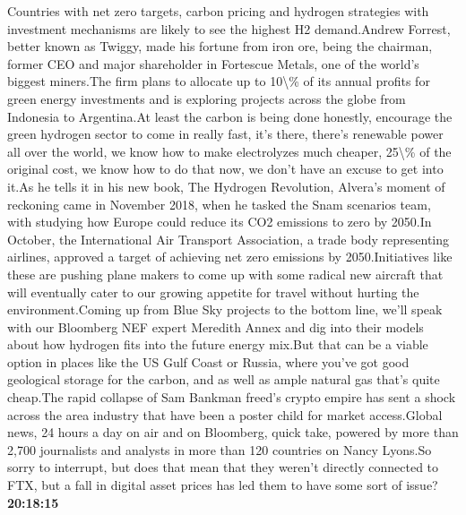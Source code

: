 \documentclass{article}%
\begin{document}
Countries with net zero targets, carbon pricing and hydrogen strategies with investment mechanisms are likely to see the highest H2 demand.Andrew Forrest, better known as Twiggy, made his fortune from iron ore, being the chairman, former CEO and major shareholder in Fortescue Metals, one of the world's biggest miners.The firm plans to allocate up to 10\textbackslash{}\% of its annual profits for green energy investments and is exploring projects across the globe from Indonesia to Argentina.At least the carbon is being done honestly, encourage the green hydrogen sector to come in really fast, it's there, there's renewable power all over the world, we know how to make electrolyzes much cheaper, 25\textbackslash{}\% of the original cost, we know how to do that now, we don't have an excuse to get into it.As he tells it in his new book, The Hydrogen Revolution, Alvera's moment of reckoning came in November 2018, when he tasked the Snam scenarios team, with studying how Europe could reduce its CO2 emissions to zero by 2050.In October, the International Air Transport Association, a trade body representing airlines, approved a target of achieving net zero emissions by 2050.Initiatives like these are pushing plane makers to come up with some radical new aircraft that will eventually cater to our growing appetite for travel without hurting the environment.Coming up from Blue Sky projects to the bottom line, we'll speak with our Bloomberg NEF expert Meredith Annex and dig into their models about how hydrogen fits into the future energy mix.But that can be a viable option in places like the US Gulf Coast or Russia, where you've got good geological storage for the carbon, and as well as ample natural gas that's quite cheap.The rapid collapse of Sam Bankman freed's crypto empire has sent a shock across the area industry that have been a poster child for market access.Global news, 24 hours a day on air and on Bloomberg, quick take, powered by more than 2,700 journalists and analysts in more than 120 countries on Nancy Lyons.So sorry to interrupt, but does that mean that they weren't directly connected to FTX, but a fall in digital asset prices has led them to have some sort of issue?%
\textbf{20:18:15}%
\newline%
\end{document}
